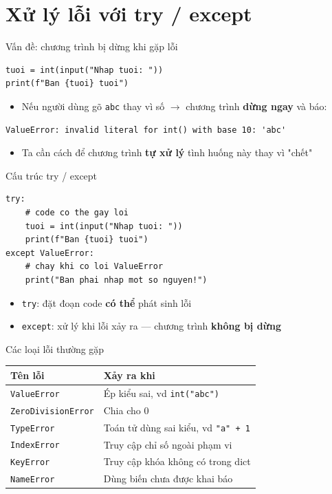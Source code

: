 \documentclass[11pt]{beamer}
\begin{document}
\section{Xử lý lỗi với try / except}

\begin{frame}[fragile]{Vấn đề: chương trình bị dừng khi gặp lỗi}
\begin{lstlisting}
tuoi = int(input("Nhap tuoi: "))
print(f"Ban {tuoi} tuoi")
\end{lstlisting}
\begin{itemize}
  \item Nếu người dùng gõ \texttt{abc} thay vì số $\to$ chương trình \textbf{dừng ngay} và báo:
\end{itemize}
\begin{lstlisting}
ValueError: invalid literal for int() with base 10: 'abc'
\end{lstlisting}
\begin{itemize}
  \item Ta cần cách để chương trình \textbf{tự xử lý} tình huống này thay vì "chết"
\end{itemize}
\end{frame}

\begin{frame}[fragile]{Cấu trúc try / except}
\begin{lstlisting}
try:
    # code co the gay loi
    tuoi = int(input("Nhap tuoi: "))
    print(f"Ban {tuoi} tuoi")
except ValueError:
    # chay khi co loi ValueError
    print("Ban phai nhap mot so nguyen!")
\end{lstlisting}
\begin{itemize}
  \item \texttt{try}: đặt đoạn code \textbf{có thể} phát sinh lỗi
  \item \texttt{except}: xử lý khi lỗi xảy ra — chương trình \textbf{không bị dừng}
\end{itemize}
\end{frame}

\begin{frame}[fragile]{Các loại lỗi thường gặp}
\begin{center}
\begin{tabular}{|l|l|}
\hline
\textbf{Tên lỗi} & \textbf{Xảy ra khi} \\
\hline
\texttt{ValueError}     & Ép kiểu sai, vd \texttt{int("abc")} \\
\texttt{ZeroDivisionError} & Chia cho 0 \\
\texttt{TypeError}      & Toán tử dùng sai kiểu, vd \texttt{"a" + 1} \\
\texttt{IndexError}     & Truy cập chỉ số ngoài phạm vi \\
\texttt{KeyError}       & Truy cập khóa không có trong dict \\
\texttt{NameError}      & Dùng biến chưa được khai báo \\
\hline
\end{tabular}
\end{center}
\end{frame}
\end{document}
